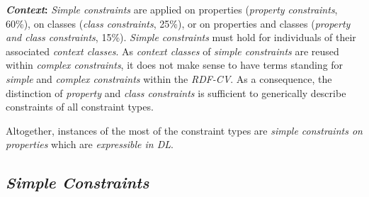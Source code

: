\documentclass[a4paper,fontsize=11pt]{scrartcl}
\newcommand{\tb}[1]{\todo[size=\small, color=green!40]{\textbf{Thomas:} #1}}
\begin{document}
\textbf{\emph{Context}:}
\emph{Simple constraints} are applied on properties (\emph{property constraints}, 60\%),
on classes (\emph{class constraints}, 25\%), or
on properties and classes (\emph{property and class constraints}, 15\%).
\emph{Simple constraints} must hold for individuals of their associated \emph{context classes}.
As \emph{context classes} of \emph{simple constraints} are reused within \emph{complex constraints},
it does not make sense to have terms standing for \emph{simple} and \emph{complex constraints} within the \emph{RDF-CV}. 
As a consequence, the distinction of \emph{property} and \emph{class constraints} is sufficient to generically describe constraints of all constraint types.

Altogether, instances of the most of the constraint types are \emph{simple constraints on properties} which are \emph{expressible in DL}. 

\subsection{\emph{Simple Constraints}}
\end{document}
